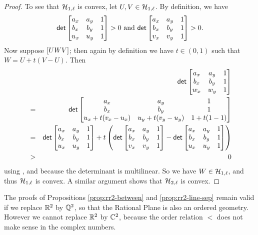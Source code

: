 \begin{proof}
To see that \(\mathcal{H}_{1,\ell}\) is convex, let \(U,V \in \mathcal{H}_{1,\ell}\).
By definition, we have \[ \mathsf{det} \begin{bmatrix} a_x & a_y & 1 \\ b_x & b_y & 1 \\ u_x & u_y & 1 \end{bmatrix} > 0\ \mathrm{and}\ \mathsf{det} \begin{bmatrix} a_x & a_y & 1 \\ b_x & b_y & 1 \\ v_x & v_y & 1 \end{bmatrix} > 0. \]
Now suppose \([ U W V ]\); then again by definition we have \(t \in (0,1)\) such that \(W = U + t(V-U)\).
Then
\begin{eqnarray*}
 & & \mathsf{det} \begin{bmatrix} a_x & a_y & 1 \\ b_x & b_y & 1 \\ w_x & w_y & 1 \end{bmatrix} \\
 & = & \mathsf{det} \begin{bmatrix} a_x & a_y & 1 \\ b_x & b_y & 1 \\ u_x + t(v_x - u_x) & u_y + t(v_y - u_y) & 1 + t(1 - 1) \end{bmatrix} \\
 & = & \mathsf{det} \begin{bmatrix} a_x & a_y & 1 \\ b_x & b_y & 1 \\ u_x & u_y & 1 \end{bmatrix} + t \left( \mathsf{det} \begin{bmatrix} a_x & a_y & 1 \\ b_x & b_y & 1 \\ v_x & v_y & 1 \end{bmatrix} - \mathsf{det} \begin{bmatrix} a_x & a_y & 1 \\ b_x & b_y & 1 \\ u_x & u_y & 1 \end{bmatrix} \right) \\
 & > & 0
\end{eqnarray*}
using , and because the determinant is multilinear.
So we have \(W \in \mathcal{H}_{1,\ell}\), and thus \(\mathcal{H}_{1,\ell}\) is convex.
A similar argument shows that \(\mathcal{H}_{2,\ell}\) is convex.
\end{proof}

The proofs of Propositions \ref{prop:rr2-between} and \ref{prop:rr2-line-sep} remain valid if we replace \(\mathbb{R}^2\) by \(\mathbb{Q}^2\), so that the Rational Plane is also an ordered geometry.
However we cannot replace \(\mathbb{R}^2\) by \(\mathbb{C}^2\), because the order relation \(<\) does not make sense in the complex numbers.
